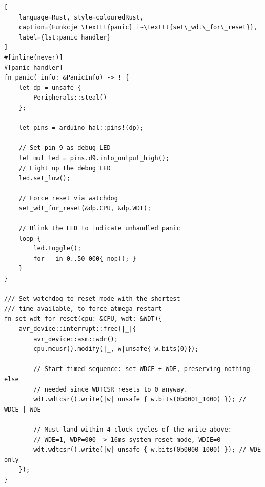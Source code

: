 \begin{lstlisting}[
    language=Rust, style=colouredRust, 
    caption={Funkcje \texttt{panic} i~\texttt{set\_wdt\_for\_reset}},
    label={lst:panic_handler}
]
#[inline(never)]
#[panic_handler]
fn panic(_info: &PanicInfo) -> ! {
    let dp = unsafe {
        Peripherals::steal()
    };

    let pins = arduino_hal::pins!(dp);

    // Set pin 9 as debug LED
    let mut led = pins.d9.into_output_high();
    // Light up the debug LED
    led.set_low();

    // Force reset via watchdog
    set_wdt_for_reset(&dp.CPU, &dp.WDT);

    // Blink the LED to indicate unhandled panic
    loop {
        led.toggle();
        for _ in 0..50_000{ nop(); }
    }
}

/// Set watchdog to reset mode with the shortest 
/// time available, to force atmega restart
fn set_wdt_for_reset(cpu: &CPU, wdt: &WDT){
    avr_device::interrupt::free(|_|{
        avr_device::asm::wdr();
        cpu.mcusr().modify(|_, w|unsafe{ w.bits(0)});

        // Start timed sequence: set WDCE + WDE, preserving nothing else
        // needed since WDTCSR resets to 0 anyway.
        wdt.wdtcsr().write(|w| unsafe { w.bits(0b0001_1000) }); // WDCE | WDE

        // Must land within 4 clock cycles of the write above:
        // WDE=1, WDP=000 -> 16ms system reset mode, WDIE=0
        wdt.wdtcsr().write(|w| unsafe { w.bits(0b0000_1000) }); // WDE only
    });
}
\end{lstlisting}